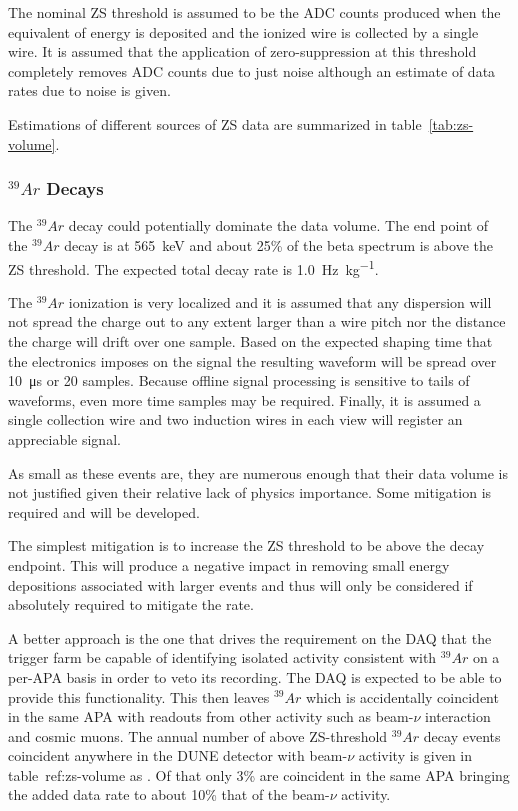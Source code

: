 The nominal ZS threshold is assumed to be the ADC counts produced when
the equivalent of \chargezsthreshold energy is deposited and the
ionized wire is collected by a single wire.
It is assumed that the application of zero-suppression at this
threshold completely removes ADC counts due to just noise although an
estimate of data rates due to noise is given.

Estimations of different sources of ZS data are summarized in table~\ref{tab:zs-volume}.



\subsubsection{$^{39}Ar$ Decays}

The $^{39}Ar$ decay could potentially dominate the data volume.
The end point of the $^{39}Ar$ decay is at \SI{565}{\keV} and about
25\% of the beta spectrum is above the ZS threshold\cite{docdb3018}.
The expected total decay rate is
\SI{1.0}{\hertz\per\kilo\gram}\cite{bkds}.

The $^{39}Ar$ ionization is very localized and it is assumed that any
dispersion will not spread the charge out to any extent larger than a
wire pitch nor the distance the charge will drift over one sample.
Based on the expected shaping time that the electronics imposes on the
signal the resulting waveform will be spread over
\SI{10}{\micro\second} or \num{20} samples.
Because offline signal processing is sensitive to tails of waveforms,
even more time samples may be required.
Finally, it is assumed a single collection wire and two induction
wires in each view will register an appreciable signal.

As small as these events are, they are numerous enough that their data
volume is not justified given their relative lack of physics importance.
Some mitigation is required and will be developed.

The simplest mitigation is to increase the ZS threshold to be above
the decay endpoint.
This will produce a negative impact in removing small energy
depositions associated with larger events and thus will only be
considered if absolutely required to mitigate the rate.

A better approach is the one that drives the requirement on the DAQ
that the trigger farm be capable of identifying isolated activity
consistent with $^{39}Ar$ on a per-APA basis in order to veto its
recording.
The DAQ is expected to be able to provide this functionality.
This then leaves $^{39}Ar$ which is accidentally coincident in the
same APA with readouts from other activity such as beam-$\nu$
interaction and cosmic muons.
The annual number of above ZS-threshold $^{39}Ar$ decay events
coincident anywhere in the DUNE detector with beam-$\nu$ activity is
given in table~{ref:zs-volume} as \betainbeamyear.
Of that only 3\% are coincident in the same APA bringing the added
data rate to about 10\% that of the beam-$\nu$ activity.

